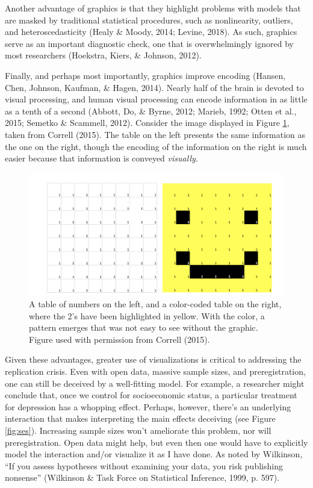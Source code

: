 \documentclass[
  doc]{apa6}
\begin{document}
Another advantage of graphics is that they highlight problems with models that are masked by traditional statistical procedures, such as nonlinearity, outliers, and heteroscedasticity (Healy \& Moody, 2014; Levine, 2018). As such, graphics serve as an important diagnostic check, one that is overwhelmingly ignored by most researchers (Hoekstra, Kiers, \& Johnson, 2012).

Finally, and perhaps most importantly, graphics improve encoding (Hansen, Chen, Johnson, Kaufman, \& Hagen, 2014). Nearly half of the brain is devoted to visual processing, and human visual processing can encode information in as little as a tenth of a second (Abbott, Do, \& Byrne, 2012; Marieb, 1992; Otten et al., 2015; Semetko \& Scammell, 2012). Consider the image displayed in Figure \ref{fig:smiley}, taken from Correll (2015). The table on the left presents the same information as the one on the right, though the encoding of the information on the right is much easier because that information is conveyed \emph{visually.}

\begin{figure}
\centering
\includegraphics{images/smiley.png}
\caption{A table of numbers on the left, and a color-coded table on the right, where the 2's have been highlighted in yellow. With the color, a pattern emerges that was not easy to see without the graphic. Figure used with permission from Correll (2015).}
\label{fig:smiley}
\end{figure}

Given these advantages, greater use of visualizations is critical to addressing the replication crisis. Even with open data, massive sample sizes, and preregistration, one can still be deceived by a well-fitting model. For example, a researcher might conclude that, once we control for socioeconomic status, a particular treatment for depression has a whopping effect. Perhaps, however, there's an underlying interaction that makes interpreting the main effects deceiving (see Figure \ref{fig:ses}). Increasing sample sizes won't ameliorate this problem, nor will preregistration. Open data might help, but even then one would have to explicitly model the interaction and/or visualize it as I have done. As noted by Wilkinson, \enquote{If you assess hypotheses without examining your data, you risk publishing nonsense} (Wilkinson \& Task Force on Statistical Inference, 1999, p. 597).
\end{document}
